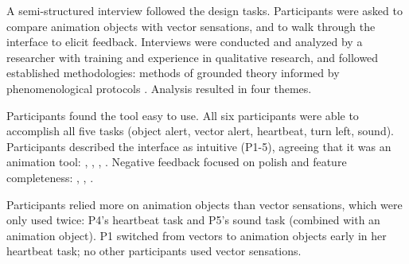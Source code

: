 A semi-structured interview followed the design tasks.
Participants were asked to compare animation objects with vector sensations, and to walk through the interface to elicit feedback.
%
%
Interviews were conducted and analyzed by a researcher with training and experience in qualitative research, and followed established methodologies:
methods of grounded theory  \cite{Corbin2008} informed by phenomenological protocols \cite{Moustakas1994}.
Analysis resulted in four themes.

Participants found the tool easy to use.
All six participants were able to accomplish all five tasks (object alert, vector alert, heartbeat, turn left, sound).
Participants described the interface as intuitive (P1-5), agreeing that it was an animation tool: , , , .
Negative feedback focused on polish and feature completeness:
, , .


Participants relied more on animation objects %
than vector sensations, which
were only used twice: P4's heartbeat task and P5's sound task (combined with an animation object).
P1 switched from vectors to animation objects early in her heartbeat task;
no other participants used vector sensations.


